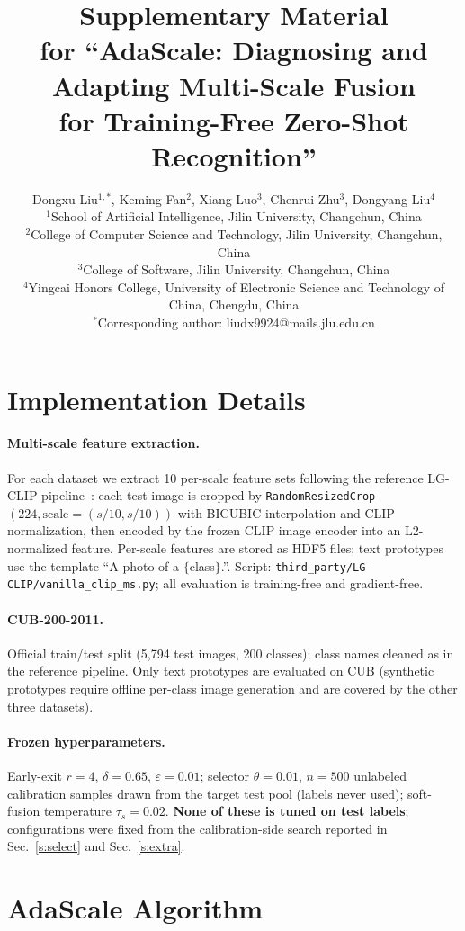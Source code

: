 \documentclass[10pt]{article}
\title{Supplementary Material\\ for ``AdaScale: Diagnosing and Adapting Multi-Scale Fusion\\ for Training-Free Zero-Shot Recognition''}
\author{Dongxu Liu$^{1,\ast}$, Keming Fan$^{2}$, Xiang Luo$^{3}$, Chenrui Zhu$^{3}$, Dongyang Liu$^{4}$\\
$^{1}$School of Artificial Intelligence, Jilin University, Changchun, China\\
$^{2}$College of Computer Science and Technology, Jilin University, Changchun, China\\
$^{3}$College of Software, Jilin University, Changchun, China\\
$^{4}$Yingcai Honors College, University of Electronic Science and Technology of China, Chengdu, China\\
$^{\ast}$Corresponding author: liudx9924@mails.jlu.edu.cn}
\date{}
\begin{document}
\maketitle
\vspace{-2em}

\section{Implementation Details}
\label{s:impl}

\paragraph{Multi-scale feature extraction.}
For each dataset we extract 10 per-scale feature sets following the
reference LG-CLIP pipeline~\cite{shi2026lgclip}: each test image is cropped
by \texttt{RandomResizedCrop}$(224, \text{scale}=(s/10, s/10))$ with BICUBIC
interpolation and CLIP normalization, then encoded by the frozen CLIP image
encoder into an L2-normalized feature. Per-scale features are stored as HDF5
files; text prototypes use the template ``A photo of a $\{$class$\}$.''.
Script: \texttt{third\_party/LG-CLIP/vanilla\_clip\_ms.py}; all evaluation is
training-free and gradient-free.

\paragraph{CUB-200-2011.}
Official train/test split (5{,}794 test images, 200 classes); class names
cleaned as in the reference pipeline. Only text prototypes are evaluated on
CUB (synthetic prototypes require offline per-class image generation and are
covered by the other three datasets).

\paragraph{Frozen hyperparameters.}
Early-exit $r{=}4$, $\delta{=}0.65$, $\varepsilon{=}0.01$; selector
$\theta{=}0.01$, $n{=}500$ unlabeled calibration samples drawn from the target test pool (labels never used); soft-fusion
temperature $\tau_s{=}0.02$. \textbf{None of these is tuned on test labels};
configurations were fixed from the calibration-side search reported in
Sec.~\ref{s:select} and Sec.~\ref{s:extra}.

\section{AdaScale Algorithm}
\label{s:algo}
\end{document}
